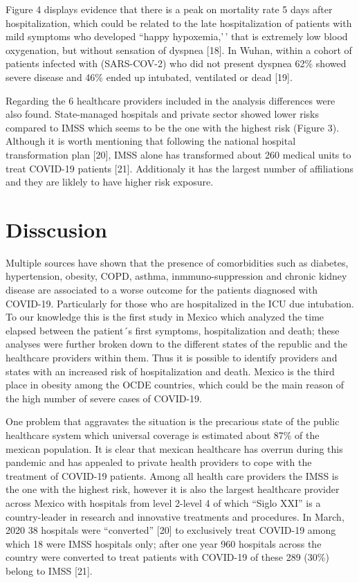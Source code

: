 \documentclass[10pt,letterpaper]{article}
\begin{document}
Figure 4 displays evidence that there is a peak on mortality rate 5 days
after hospitalization, which could be related to the late
hospitalization of patients with mild symptoms who developed ``happy
hypoxemia,'\,' that is extremely low blood oxygenation, but without
sensation of dyspnea {[}18{]}. In Wuhan, within a cohort of patients
infected with (SARS-COV-2) who did not present dyspnea 62\% showed
severe disease and 46\% ended up intubated, ventilated or dead {[}19{]}.

Regarding the 6 healthcare providers included in the analysis
differences were also found. State-managed hospitals and private sector
showed lower risks compared to IMSS which seems to be the one with the
highest risk (Figure 3). Although it is worth mentioning that following
the national hospital transformation plan {[}20{]}, IMSS alone has
transformed about 260 medical units to treat COVID-19 patients {[}21{]}.
Additionaly it has the largest number of affiliations and they are
liklely to have higher risk exposure.

\hypertarget{disscusion}{%
\section{Disscusion}\label{disscusion}}

Multiple sources have shown that the presence of comorbidities such as
diabetes, hypertension, obesity, COPD, asthma, inmmuno-suppression and
chronic kidney disease are associated to a worse outcome for the
patients diagnosed with COVID-19. Particularly for those who are
hospitalized in the ICU due intubation. To our knowledge this is the
first study in Mexico which analyzed the time elapsed between the
patient´s first symptoms, hospitalization and death; these analyses were
further broken down to the different states of the republic and the
healthcare providers within them. Thus it is possible to identify
providers and states with an increased risk of hospitalization and
death. Mexico is the third place in obesity among the OCDE countries,
which could be the main reason of the high number of severe cases of
COVID-19.

One problem that aggravates the situation is the precarious state of the
public healthcare system which universal coverage is estimated about
87\% of the mexican population. It is clear that mexican healthcare has
overrun during this pandemic and has appealed to private health
providers to cope with the treatment of COVID-19 patients. Among all
health care providers the IMSS is the one with the highest risk, however
it is also the largest healthcare provider across Mexico with hospitals
from level 2-level 4 of which ``Siglo XXI'' is a country-leader in
research and innovative treatments and procedures. In March, 2020 38
hospitals were ``converted'' {[}20{]} to exclusively treat COVID-19
among which 18 were IMSS hospitals only; after one year 960 hospitals
across the country were converted to treat patients with COVID-19 of
these 289 (30\%) belong to IMSS {[}21{]}.
\end{document}
